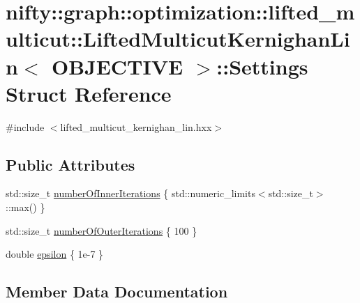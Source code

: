 \hypertarget{structnifty_1_1graph_1_1optimization_1_1lifted__multicut_1_1LiftedMulticutKernighanLin_1_1Settings}{}\section{nifty\+:\+:graph\+:\+:optimization\+:\+:lifted\+\_\+multicut\+:\+:Lifted\+Multicut\+Kernighan\+Lin$<$ O\+B\+J\+E\+C\+T\+I\+V\+E $>$\+:\+:Settings Struct Reference}
\label{structnifty_1_1graph_1_1optimization_1_1lifted__multicut_1_1LiftedMulticutKernighanLin_1_1Settings}


{\ttfamily \#include $<$lifted\+\_\+multicut\+\_\+kernighan\+\_\+lin.\+hxx$>$}

\subsection*{Public Attributes}
\begin{DoxyCompactItemize}
\item 
std\+::size\+\_\+t \hyperlink{structnifty_1_1graph_1_1optimization_1_1lifted__multicut_1_1LiftedMulticutKernighanLin_1_1Settings_aca86bdef48a7c82e529c89fb57d7afd0}{number\+Of\+Inner\+Iterations} \{ std\+::numeric\+\_\+limits$<$std\+::size\+\_\+t$>$\+::max() \}
\item 
std\+::size\+\_\+t \hyperlink{structnifty_1_1graph_1_1optimization_1_1lifted__multicut_1_1LiftedMulticutKernighanLin_1_1Settings_aa207f2cbb74945be916e7594cb41381c}{number\+Of\+Outer\+Iterations} \{ 100 \}
\item 
double \hyperlink{structnifty_1_1graph_1_1optimization_1_1lifted__multicut_1_1LiftedMulticutKernighanLin_1_1Settings_acf60bdb1da4f197a76f953ced1be6d42}{epsilon} \{ 1e-\/7 \}
\end{DoxyCompactItemize}


\subsection{Member Data Documentation}
\hypertarget{structnifty_1_1graph_1_1optimization_1_1lifted__multicut_1_1LiftedMulticutKernighanLin_1_1Settings_acf60bdb1da4f197a76f953ced1be6d42}{}
